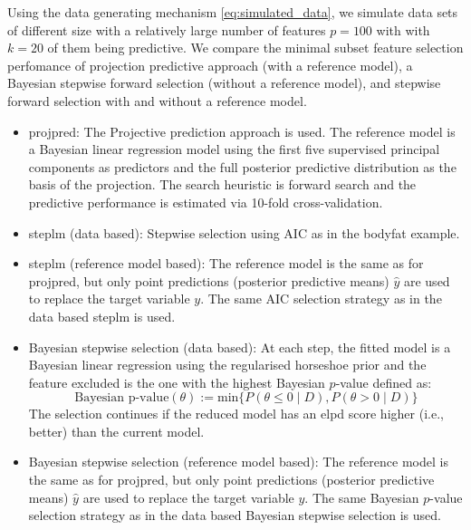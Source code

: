 \documentclass[american,]{article}
\theoremstyle{definition}
\begin{document}
Using the data generating mechanism \eqref{eq:simulated_data}, we
simulate data sets of different size with a relatively large number of
features $p=100$ with with $k=20$ of them being predictive.
We compare the minimal subset feature selection perfomance of
projection predictive approach (with a reference model), a Bayesian
stepwise forward selection (without a reference model), and stepwise
forward selection with and without a reference model.
\begin{itemize}
\item projpred: The Projective prediction approach is used. 
  The reference model is a Bayesian linear regression
  model using the first five supervised principal components as predictors
  and the full posterior predictive distribution as the basis of the projection.   
  The search heuristic  is forward search and the predictive performance 
  is estimated via 10-fold cross-validation.
  
\item steplm (data based): Stepwise selection using AIC as in the bodyfat example.

\item steplm (reference model based): The reference model is the same as for
 projpred, but only point predictions (posterior predictive means) $\hat{y}$ 
 are used to replace the target variable $y$. The same AIC selection strategy 
 as in the data based steplm is used.

\item Bayesian stepwise selection (data based): At each step, the fitted model
 is a Bayesian linear regression using the regularised horseshoe
  prior and the feature excluded is the one with the highest Bayesian
  $p$-value defined as:
\begin{equation}
\text{Bayesian p-value}(\theta) := \text{min}\{P(\theta\leq0 \; | \; D),P(\theta>0 \; | \; D)\}
\end{equation}
The selection continues if the reduced model has an elpd score higher 
(i.e., better) than the current model.

\item Bayesian stepwise selection (reference model based): The reference model is the same as for projpred, but only point predictions (posterior predictive means) $\hat{y}$ are used to replace the target variable $y$. The same Bayesian
  $p$-value selection strategy as in the data based Bayesian stepwise selection is used.

\end{itemize}
\end{document}
